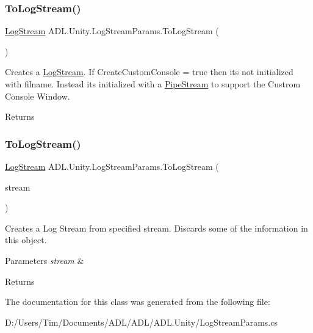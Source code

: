 \subsubsection{\texorpdfstring{To\+Log\+Stream()}{ToLogStream()}\hspace{0.1cm}{\footnotesize\ttfamily [1/2]}}
{\footnotesize\ttfamily \mbox{\hyperlink{class_a_d_l_1_1_log_stream}{Log\+Stream}} A\+D\+L.\+Unity.\+Log\+Stream\+Params.\+To\+Log\+Stream (\begin{DoxyParamCaption}{ }\end{DoxyParamCaption})}



Creates a \mbox{\hyperlink{class_a_d_l_1_1_log_stream}{Log\+Stream}}. If Create\+Custom\+Console = true then its not initialized with filname. Instead its initialized with a \mbox{\hyperlink{class_a_d_l_1_1_pipe_stream}{Pipe\+Stream}} to support the Custrom Console Window. 

\begin{DoxyReturn}{Returns}

\end{DoxyReturn}
\mbox{\label{class_a_d_l_1_1_unity_1_1_log_stream_params_a8cd3548465c20596918ee37292bed704}} 
\subsubsection{\texorpdfstring{To\+Log\+Stream()}{ToLogStream()}\hspace{0.1cm}{\footnotesize\ttfamily [2/2]}}
{\footnotesize\ttfamily \mbox{\hyperlink{class_a_d_l_1_1_log_stream}{Log\+Stream}} A\+D\+L.\+Unity.\+Log\+Stream\+Params.\+To\+Log\+Stream (\begin{DoxyParamCaption}\item[{System.\+I\+O.\+Stream}]{stream }\end{DoxyParamCaption})}



Creates a Log Stream from specified stream. Discards some of the information in this object. 


\begin{DoxyParams}{Parameters}
{\em stream} & \\
\hline
\end{DoxyParams}
\begin{DoxyReturn}{Returns}

\end{DoxyReturn}


The documentation for this class was generated from the following file\+:\begin{DoxyCompactItemize}
\item 
D\+:/\+Users/\+Tim/\+Documents/\+A\+D\+L/\+A\+D\+L/\+A\+D\+L.\+Unity/Log\+Stream\+Params.\+cs\end{DoxyCompactItemize}
